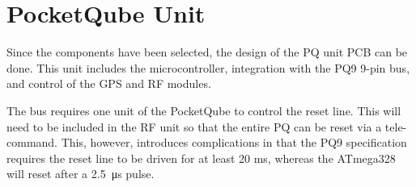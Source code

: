 \section{PocketQube Unit}

Since the components have been selected, the design of the PQ unit PCB can be done. This unit includes the microcontroller, integration with the PQ9 9-pin bus, and control of the GPS and RF modules.

The bus requires one unit of the PocketQube to control the reset line. This will need to be included in the RF unit so that the entire PQ can be reset via a tele-command. This, however, introduces complications in that the PQ9 specification requires the reset line to be driven for at least 20 ms, whereas the ATmega328 will reset after a \SI{2.5}{\micro \second} pulse.